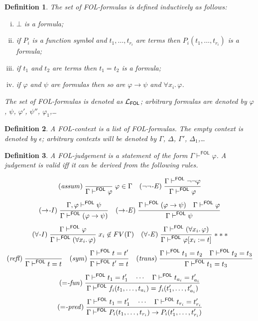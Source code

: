\documentclass{article}
\newtheorem{definition}{Definition}[section]
\newcommand{\FOL}{\textsf{FOL}}
\newcommand{\lang}[1]{\ensuremath{{\cal L}_{\mathsf{#1}}}}
\newcommand{\myvdash}[1]{\ensuremath{\vdash^{\mathsf{#1}}}}
\def\namerule#1{({\it #1\/})}
\def\rulexn#1#2#3{\makebox[0pt][r]{\hss\namerule{#1}$\;\;$}\frac{\displaystyle\strut #2}{\displaystyle\strut #3}}
\def\rulexnc#1#2#3#4{\makebox[0pt][r]{\hss\namerule{#1}$\;\;$}\frac{\displaystyle\strut #2}{\displaystyle\strut #3}\mrlap{#4}}
\def\mrlap#1{\makebox[0pt][l]{$\displaystyle\;\;#1$\hss}}
\def\rulexn#1#2#3{\mbox{\namerule{#1}}\;\frac{\displaystyle\strut #2}{\displaystyle\strut #3}}
\def\rulexnc#1#2#3#4{\mbox{\namerule{#1}}\;\frac{\displaystyle\strut #2}{\displaystyle\strut #3}\mrlap{#4}}
\def\mrlap#1{{\displaystyle\;#1}}
\def\sep{.\,}
\begin{document}
\begin{definition}\label{defn:FOLformulas}
The set of {\FOL}-formulas is defined inductively as follows:
\begin{enumerate}[(i)]
\item $\bot$ is a formula;
\item if $P_i$ is a function symbol and $t_1,\ldots,t_{r_i}$ are terms
then $P_i(t_1,\ldots,t_{r_i})$ is a formula;
\item if $t_1$ and $t_2$ are terms then $t_1=t_2$ is a formula;
\item if $\varphi$ and $\psi$ are formulas then so are $\varphi\to\psi$
and $\forall x_i\sep\varphi$.
\end{enumerate}
The set of {\FOL}-formulas is denoted as {\lang{FOL}}; arbitrary formulas
are denoted by $\varphi$, $\psi$, $\varphi'$, $\psi''$, $\varphi_1$,\ldots
\end{definition}

\begin{definition}\label{defn:FOLcontext}
A {\FOL}-context is a list of {\FOL}-formulas.  The empty context is denoted
by $\epsilon$; arbitrary contexts will be denoted by $\Gamma$, $\Delta$,
$\Gamma'$, $\Delta_1$,\ldots
\end{definition}

\begin{definition}\label{defn:FOLderivation}\label{defn:FOLjudgement}
A {\FOL}-judgement is a statement of the form $\Gamma\myvdash{FOL}\varphi$.
A judgement is \emph{valid} iff it can be derived from the following rules.

$$\rulexnc{assum}{}{\Gamma\myvdash{FOL}\varphi}{\varphi\in\Gamma}
\quad
\rulexn{$\neg\neg$-E}{\Gamma\myvdash{FOL}\neg\neg\varphi}{\Gamma\myvdash{FOL}\varphi}$$
$$\rulexn{$\to$-I}{\Gamma,\varphi\myvdash{FOL}\psi}{\Gamma\myvdash{FOL}(\varphi\to\psi)}
\quad
\rulexn{$\to$-E}{\Gamma\myvdash{FOL}(\varphi\to\psi) \quad \Gamma\myvdash{FOL}\varphi}
                {\Gamma\myvdash{FOL}\psi}$$
$$\rulexnc{$\forall$-I}{\Gamma\myvdash{FOL}\varphi}
   {\Gamma\myvdash{FOL}(\forall x_i\sep\varphi)}{x_i\not\in FV(\Gamma)}
\quad
\rulexnc{$\forall$-E}{\Gamma\myvdash{FOL}(\forall x_i\sep\varphi)}
                     {\Gamma\myvdash{FOL}\varphi[x_i:=t]}{***}$$
$$\rulexn{refl}{}{\Gamma\myvdash{FOL} t=t}
\quad
\rulexn{sym}{\Gamma\myvdash{FOL} t=t'}{\Gamma\myvdash{FOL} t'=t}
\quad
\rulexn{trans}{\Gamma\myvdash{FOL} t_1=t_2 \quad \Gamma\myvdash{FOL} t_2=t_3}
              {\Gamma\myvdash{FOL} t_1=t_3}$$
$$\rulexn{$=$-fun}
   {\Gamma\myvdash{FOL} t_1=t'_1 \quad \cdots \quad \Gamma\myvdash{FOL} t_{a_i}=t'_{a_i}}
   {\Gamma\myvdash{FOL} f_i(t_1,\ldots, t_{a_i})=f_i(t'_1,\ldots, t'_{a_i})}$$
$$\rulexn{$=$-pred}
   {\Gamma\myvdash{FOL} t_1=t'_1 \quad \cdots \quad \Gamma\myvdash{FOL} t_{r_i}=t'_{r_i}}
   {\Gamma\myvdash{FOL} P_i(t_1,\ldots, t_{r_i}) \to P_i(t'_1,\ldots, t'_{r_i})}$$
\end{definition}
\end{document}
